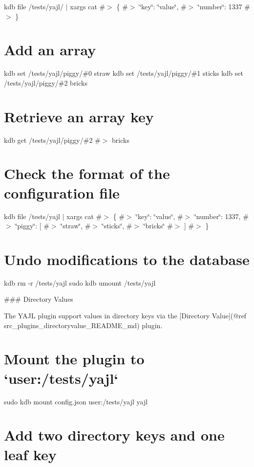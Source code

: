 kdb file /tests/yajl/ $\vert$ xargs cat \#$>$ \{ \#$>$ \char`\"{}key\char`\"{}\+: \char`\"{}value\char`\"{}, \#$>$ \char`\"{}number\char`\"{}\+: 1337 \#$>$ \}\hypertarget{autotoc_md786_autotoc_md801}{}\section{Add an array}\label{autotoc_md786_autotoc_md801}
kdb set /tests/yajl/piggy/\#0 straw kdb set /tests/yajl/piggy/\#1 sticks kdb set /tests/yajl/piggy/\#2 bricks\hypertarget{autotoc_md786_autotoc_md802}{}\section{Retrieve an array key}\label{autotoc_md786_autotoc_md802}
kdb get /tests/yajl/piggy/\#2 \#$>$ bricks\hypertarget{autotoc_md786_autotoc_md803}{}\section{Check the format of the configuration file}\label{autotoc_md786_autotoc_md803}
kdb file /tests/yajl $\vert$ xargs cat \#$>$ \{ \#$>$ \char`\"{}key\char`\"{}\+: \char`\"{}value\char`\"{}, \#$>$ \char`\"{}number\char`\"{}\+: 1337, \#$>$ \char`\"{}piggy\char`\"{}\+: \mbox{[} \#$>$ \char`\"{}straw\char`\"{}, \#$>$ \char`\"{}sticks\char`\"{}, \#$>$ \char`\"{}bricks\char`\"{} \#$>$ \mbox{]} \#$>$ \}\hypertarget{autotoc_md786_autotoc_md804}{}\section{Undo modifications to the database}\label{autotoc_md786_autotoc_md804}
kdb rm -\/r /tests/yajl sudo kdb umount /tests/yajl 
\begin{DoxyCode}
### Directory Values

The YAJL plugin support values in directory keys via the [Directory Value](@ref
       src\_plugins\_directoryvalue\_README\_md) plugin.
\end{DoxyCode}
 \hypertarget{autotoc_md786_autotoc_md805}{}\section{Mount the plugin to `user\+:/tests/yajl`}\label{autotoc_md786_autotoc_md805}
sudo kdb mount config.\+json user\+:/tests/yajl yajl\hypertarget{autotoc_md786_autotoc_md806}{}\section{Add two directory keys and one leaf key}\label{autotoc_md786_autotoc_md806}
